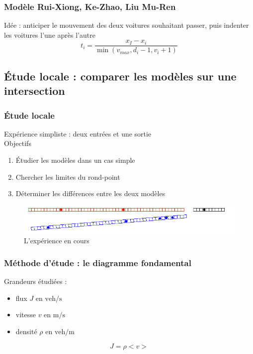 \documentclass[slidetop,11pt]{beamer}
\begin{document}
	
\begin{frame}
	\frametitle{Modèle Rui-Xiong, Ke-Zhao, Liu Mu-Ren}
	Idée : anticiper le mouvement des deux voitures souhaitant passer, puis indenter les voitures l'une après l'autre
		\begin{equation}
			t_i = \frac{x_I - x_i}{\min(v_{max},d_i-1,v_i+1)}
		\end{equation}
\end{frame}
	\subsection{Étude locale : comparer les modèles sur une intersection}

\begin{frame}
	\frametitle{Étude locale}
	Expérience simpliste : deux entrées et une sortie \\
	Objectifs
	\begin{enumerate}
		\item Étudier les modèles dans un cas simple
	 	\item Chercher les limites du rond-point
		\item Déterminer les différences entre les deux modèles
	\end{enumerate}
	\begin{figure}
		\begin{center}
			\includegraphics[scale=0.5]{./images/localdebut}	
		\end{center}
		\caption{L'expérience en cours}
	\end{figure}		
\end{frame}	

\begin{frame}
	\frametitle{Méthode d'étude : le diagramme fondamental}
	Grandeurs étudiées : 
	\begin{itemize}
		\item flux $J \text{ en } \mathrm{veh}/\mathrm{s}$
		\item vitesse $v \text{ en } \mathrm{m}/\mathrm{s}$
		\item densité $\rho \text{ en } \mathrm{veh}/\mathrm{m}$
	\end{itemize}
	$$J = \rho<v>$$
\end{frame}
\end{document}
